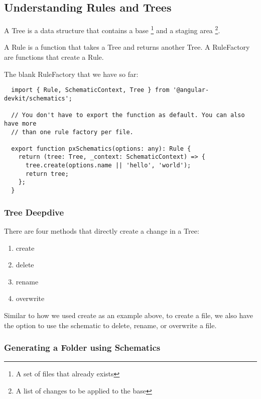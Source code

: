 \subsection{ Understanding Rules and Trees }
A Tree is a data structure that contains a base \footnote{A set of files that already exists}
and a staging area \footnote{A list of changes to be applied to the base}.

A Rule is a function that takes a Tree and returns another Tree. A RuleFactory
are functions that create a Rule.

The blank RuleFactory that we have so far:

\begin{lstlisting}
  import { Rule, SchematicContext, Tree } from '@angular-devkit/schematics';

  // You don't have to export the function as default. You can also have more
  // than one rule factory per file.

  export function pxSchematics(options: any): Rule {
    return (tree: Tree, _context: SchematicContext) => {
      tree.create(options.name || 'hello', 'world');
      return tree;
    };
  }

\end{lstlisting}


\subsubsection{ Tree Deepdive}
There are four methods that directly create a change in a Tree:
\begin{enumerate}
  \item create
  \item delete
  \item rename
  \item overwrite
\end{enumerate}

Similar to how we used create as an example above, to create a file, we also
have the option to use the schematic to delete, rename, or overwrite a file.

\subsubsection{ Generating a Folder using Schematics }
